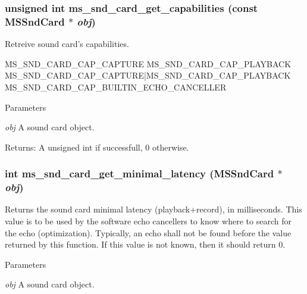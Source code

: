 \subsubsection[{ms\_\-snd\_\-card\_\-get\_\-capabilities}]{\setlength{\rightskip}{0pt plus 5cm}unsigned int ms\_\-snd\_\-card\_\-get\_\-capabilities (const {\bf MSSndCard} $\ast$ {\em obj})}\label{group__mediastreamer2__soundcardfilter_ga0268ea0348487e0ff4f9617a207fc1ae}
Retreive sound card's capabilities.


\begin{DoxyPre}
   MS\_SND\_CARD\_CAP\_CAPTURE
   MS\_SND\_CARD\_CAP\_PLAYBACK
   MS\_SND\_CARD\_CAP\_CAPTURE|MS\_SND\_CARD\_CAP\_PLAYBACK
   MS\_SND\_CARD\_CAP\_BUILTIN\_ECHO\_CANCELLER
 \end{DoxyPre}



\begin{DoxyParams}{Parameters}
\item[{\em obj}]A sound card object.\end{DoxyParams}
Returns: A unsigned int if successfull, 0 otherwise. 
\subsubsection[{ms\_\-snd\_\-card\_\-get\_\-minimal\_\-latency}]{\setlength{\rightskip}{0pt plus 5cm}int ms\_\-snd\_\-card\_\-get\_\-minimal\_\-latency ({\bf MSSndCard} $\ast$ {\em obj})}\label{group__mediastreamer2__soundcardfilter_ga7c85d1aa93e587e8c07f4e200b645628}
Returns the sound card minimal latency (playback+record), in milliseconds. This value is to be used by the software echo cancellers to know where to search for the echo (optimization). Typically, an echo shall not be found before the value returned by this function. If this value is not known, then it should return 0. 
\begin{DoxyParams}{Parameters}
\item[{\em obj}]A sound card object. \end{DoxyParams}
